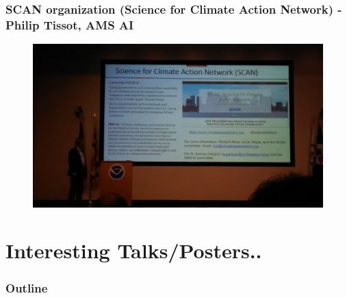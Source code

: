 \documentclass{beamer}
\begin{document}
\begin{frame}
\frametitle{SCAN organization (Science for Climate Action Network) - Philip Tissot, AMS AI}
\begin{figure}
	\includegraphics[width=\linewidth]{figs/P_20190423_105212.jpg}
\end{figure}
\end{frame}

\section{Interesting Talks/Posters..}

\begin{frame}
\frametitle{Outline} %
\tableofcontents[currentsection] %
\end{frame}
%
\end{document}
